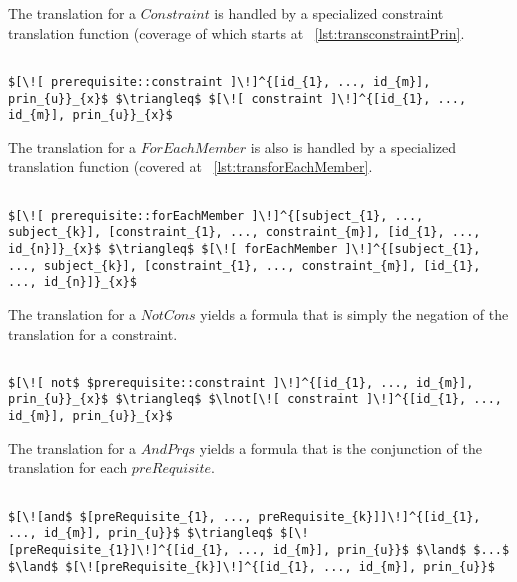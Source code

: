 The translation for a $Constraint$ is handled by a specialized constraint translation function (coverage of which starts at ~\ref{lst:transconstraintPrin}.

\lstset{mathescape, language=AST}  
\begin{lstlisting}[frame=single, caption={Prerequisite Translation {$\colon$} Constraint},label={lst:transpreRequisiteConstraint}]

$[\![ prerequisite::constraint ]\!]^{[id_{1}, ..., id_{m}], prin_{u}}_{x}$ $\triangleq$ $[\![ constraint ]\!]^{[id_{1}, ..., id_{m}], prin_{u}}_{x}$ 
\end{lstlisting}

The translation for a $ForEachMember$ is also is handled by a specialized translation function (covered at ~\ref{lst:transforEachMember}.

\lstset{mathescape, language=AST}  
\begin{lstlisting}[frame=single, caption={Prerequisite Translation {$\colon$} ForEachMember},label={lst:transpreRequisiteForEachMember}]

$[\![ prerequisite::forEachMember ]\!]^{[subject_{1}, ..., subject_{k}], [constraint_{1}, ..., constraint_{m}], [id_{1}, ..., id_{n}]}_{x}$ $\triangleq$ $[\![ forEachMember ]\!]^{[subject_{1}, ..., subject_{k}], [constraint_{1}, ..., constraint_{m}], [id_{1}, ..., id_{n}]}_{x}$ 	
\end{lstlisting}

The translation for a $NotCons$ yields a formula that is simply the negation of the translation for a constraint.

\lstset{mathescape, language=AST}  
\begin{lstlisting}[frame=single, caption={Prerequisite Translation {$\colon$} Not Constraint},label={lst:transpreRequisiteNotConstraint}]

$[\![ not$ $prerequisite::constraint ]\!]^{[id_{1}, ..., id_{m}], prin_{u}}_{x}$ $\triangleq$ $\lnot[\![ constraint ]\!]^{[id_{1}, ..., id_{m}], prin_{u}}_{x}$ 
\end{lstlisting}

The translation for a $AndPrqs$ yields a formula that is the conjunction of the translation for each $preRequisite$.

\lstset{mathescape, language=AST}  
\begin{lstlisting}[frame=single, caption={Prerequisite Translation {$\colon$} Conjunction },label={lst:transpreRequisiteAndPrqs}]

$[\![and$ $[preRequisite_{1}, ..., preRequisite_{k}]]\!]^{[id_{1}, ..., id_{m}], prin_{u}}$ $\triangleq$ $[\![preRequisite_{1}]\!]^{[id_{1}, ..., id_{m}], prin_{u}}$ $\land$ $...$ $\land$ $[\![preRequisite_{k}]\!]^{[id_{1}, ..., id_{m}], prin_{u}}$

\end{lstlisting}

